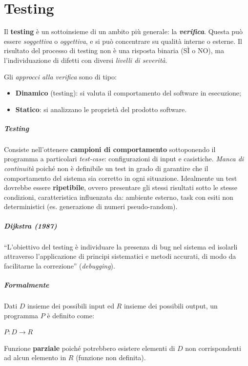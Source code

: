 \chapter{Testing}

Il \textbf{testing} è un sottoinsieme di un ambito più generale: la \textbf{\textit{verifica}}.
Questa può essere \textit{soggettiva} o \textit{oggettiva}, e si può concentrare su qualità interne o esterne. Il risultato del processo di testing non è una risposta binaria (SÌ o NO), ma l'individuazione di difetti con diversi \textit{livelli di severità}.

Gli \textit{approcci alla verifica} sono di tipo:
\begin{itemize}
    \item \textbf{Dinamico} (testing): si valuta il comportamento del software in esecuzione;
    \item \textbf{Statico}: si analizzano le proprietà del prodotto software.
\end{itemize}

\paragraph{Testing} Consiste nell'ottenere \textbf{campioni di comportamento} sottoponendo il programma a particolari \textit{test-case}: configurazioni di input e casistiche. \textit{Manca di continuità} poiché non è definibile un test in grado di garantire che il comportamento del sistema sia corretto in ogni situazione. Idealmente un test dovrebbe essere \textbf{ripetibile}, ovvero presentare gli stessi risultati sotto le stesse condizioni, caratteristica influenzata da: ambiente esterno, task con esiti non deterministici (es. generazione di numeri pseudo-random).

\paragraph{Dijkstra (1987)} “L'obiettivo del testing è individuare la presenza di bug nel sistema ed isolarli attraverso l'applicazione di principi sistematici e metodi accurati, di modo da facilitarne la correzione” (\textit{debugging}).

\paragraph{Formalmente} Dati $D$ insieme dei possibili input ed $R$ insieme dei possibili output, un programma $P$ è definito come:
\begin{center}
    $P : D \rightarrow R$
\end{center}
Funzione \textbf{parziale} poiché potrebbero esistere elementi di $D$ non corrispondenti ad alcun elemento in $R$ (funzione non definita).

